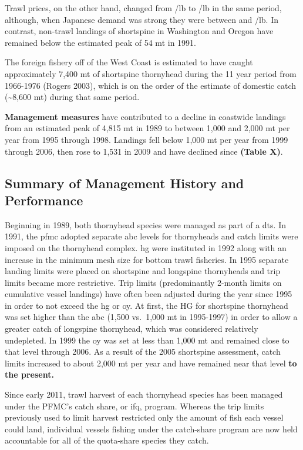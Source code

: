 \documentclass[11pt,
  english,
  letterpaper,
]{article}
\begin{document}
Trawl prices, on the other hand, changed from /lb to /lb in the same period, although, when Japanese demand was strong they were between  and /lb. In contrast, non-trawl landings of shortspine in Washington and Oregon have remained below the estimated peak of 54 mt in 1991.

The foreign fishery off of the West Coast is estimated to have caught approximately 7,400 mt of shortspine thornyhead during the 11 year period from 1966-1976 (Rogers 2003), which is on the order of the estimate of domestic catch (\textasciitilde8,600 mt) during that same period.

\textbf{Management measures} have contributed to a decline in coastwide landings from an estimated peak of 4,815 mt in 1989 to between 1,000 and 2,000 mt per year from 1995 through 1998. Landings fell below 1,000 mt per year from 1999 through 2006, then rose to 1,531 in 2009 and have declined since \textbf{(Table X)}.

\hypertarget{summary-of-management-history-and-performance}{%
\subsection{Summary of Management History and Performance}\label{summary-of-management-history-and-performance}}

Beginning in 1989, both thornyhead species were managed as part of a \gls{dts}. In 1991, the \gls{pfmc} adopted separate \gls{abc} levels for thornyheads and catch limits were imposed on the thornyhead complex. \gls{hg} were instituted in 1992 along with an increase in the minimum mesh size for bottom trawl fisheries. In 1995 separate landing limits were placed on shortspine and longspine thornyheads and trip limits became more restrictive. Trip limits (predominantly 2-month limits on cumulative vessel landings) have often been adjusted during the year since 1995 in order to not exceed the \gls{hg} or \gls{oy}. At first, the HG for shortspine thornyhead was set higher than the \gls{abc} (1,500 vs.~1,000 mt in 1995-1997) in order to allow a greater catch of longspine thornyhead, which was considered relatively undepleted. In 1999 the \gls{oy} was set at less than 1,000 mt and remained close to that level through 2006. As a result of the 2005 shortspine assessment, catch limits increased to about 2,000 mt per year and have remained near that level \textbf{to the present.}

Since early 2011, trawl harvest of each thornyhead species has been managed under the PFMC's catch share, or \gls{ifq}, program. Whereas the trip limits previously used to limit harvest restricted only the amount of fish each vessel could land, individual vessels fishing under the catch-share program are now held accountable for all of the quota-share species they catch.
\end{document}
